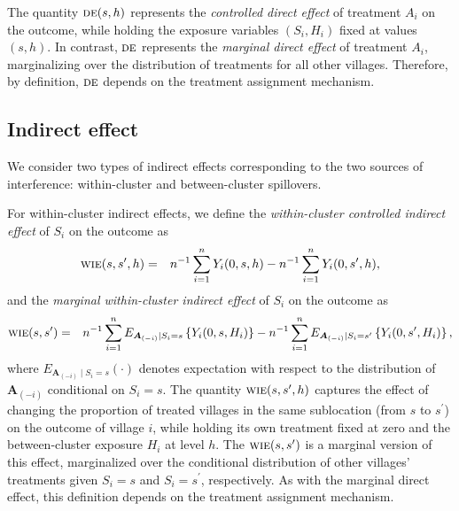 \documentclass{article}
\newcommand{\bA}{\boldsymbol{A}}
\newcommand{\sumi}{\sum_{i=1}^n}
\newcommand{\de}{\textsc{de}}
\newcommand{\wie}{\textsc{wie}}
\begin{document}
The quantity $\de(s,h)$ represents the \textit{controlled direct effect} of treatment $A_{i}$ on the outcome, while holding the exposure variables $(S_{i},H_{i})$ fixed at values $(s,h)$. In contrast, $\de$ represents the \textit{marginal direct effect} of treatment $A_{i}$, marginalizing over the distribution of treatments for all other villages. Therefore, by definition, $\de$ depends on the treatment assignment mechanism.

\subsection{Indirect effect}
We consider two types of indirect effects corresponding to the two sources of interference: within-cluster and between-cluster spillovers.

For within-cluster indirect effects, we define the \textit{within-cluster controlled indirect effect} of $S_{i}$ on the outcome as
\begin{eqnarray*}
    \wie(s,s^{\prime},h) &=& n^{-1}\sumi Y_{i}(0,s,h) - n^{-1}\sumi Y_{i}(0,s^{\prime},h),
\end{eqnarray*}
and the \textit{marginal within-cluster indirect effect} of $S_{i}$ on the outcome as
\begin{eqnarray*}
    \wie(s,s^{\prime}) &=& n^{-1}\sumi E_{\bA_{(-i)}\mid S_{i} = s}\left\{Y_{i}(0,s,H_{i})\right\} - n^{-1}\sumi E_{\bA_{(-i)}\mid S_{i} = s^{\prime}}\left\{Y_{i}(0,s^{\prime},H_{i})\right\},
\end{eqnarray*}
where $E_{\bA_{(-i)}\mid S_{i} = s}(\cdot)$ denotes expectation with respect to the distribution of $\bA_{(-i)}$ conditional on $S_{i}=s$. The quantity $\wie(s,s^{\prime},h)$ captures the effect of changing the proportion of treated villages in the same sublocation (from $s$ to $s^{\prime}$) on the outcome of village $i$, while holding its own treatment fixed at zero and the between-cluster exposure $H_{i}$ at level $h$. The $\wie(s,s^{\prime})$ is a marginal version of this effect, marginalized over the conditional distribution of other villages' treatments given $S_{i}=s$ and $S_{i}=s^{\prime}$, respectively. As with the marginal direct effect, this definition depends on the treatment assignment mechanism.
\end{document}
